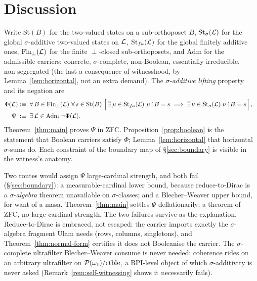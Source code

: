 \section{Discussion}\label{sec:discussion}

Write
$\mathrm{St}(B)$ for the two-valued states on a sub-orthoposet $B$,
$\mathrm{St}_\sigma(\mathcal{L})$ for the global $\sigma$-additive two-valued states on
$\mathcal{L}$, $\mathrm{St}_{fa}(\mathcal{L})$ for the global finitely additive ones,
$\mathrm{Fin}_\perp(\mathcal{L})$ for the finite $\perp$-closed sub-orthoposets, and
$\mathrm{Adm}$ for the admissible carriers: concrete, $\sigma$-complete,
non-Boolean, essentially irreducible, non-segregated (the last a consequence
of witnesshood, by Lemma~\ref{lem:horizontal}, not an extra demand). The \emph{$\sigma$-additive lifting}
property and its negation are
\begin{align*}
  \Phi(\mathcal{L})
    &:\equiv\;
    \forall\, B \in \mathrm{Fin}_\perp(\mathcal{L})\
    \forall\, s \in \mathrm{St}(B)\ \Bigl[\,
    \exists\,\mu\in\mathrm{St}_{fa}(\mathcal{L})\ \mu\!\restriction\! B=s
    \;\Longrightarrow\;
    \exists\, \nu \in \mathrm{St}_\sigma(\mathcal{L})\ \nu \!\restriction\! B = s \,\Bigr],\\
  \Psi \;&:\equiv\; \exists\, \mathcal{L} \in \mathrm{Adm}\ \neg\Phi(\mathcal{L}).
\end{align*}
Theorem~\ref{thm:main} proves $\Psi$ in ZFC. Proposition~\ref{prop:boolean} is
the statement that Boolean carriers satisfy $\Phi$; Lemma~\ref{lem:horizontal}
that horizontal $\sigma$-sums do. Each constraint of the boundary map of
\S\ref{sec:boundary} is visible in the witness's anatomy.

\begin{remark}\label{rem:strength}
Two routes would assign $\Psi$ large-cardinal strength, and both fail
(\S\ref{sec:boundary}): a measurable-cardinal lower bound, because reduce-to-Dirac
is a $\sigma$-\emph{algebra} theorem unavailable on $\sigma$-classes; and a
Blecher--Weaver upper bound, for want of a masa. Theorem~\ref{thm:main} settles
$\Psi$ deflationarily: a theorem of ZFC, no large-cardinal strength. The two
failures survive as the explanation. Reduce-to-Dirac is embraced, not escaped:
the carrier imports exactly the $\sigma$-algebra fragment Ulam needs (rows,
columns, singletons), and Theorem~\ref{thm:normal-form} certifies it does not
Booleanise the carrier. The $\sigma$-complete ultrafilter Blecher--Weaver consume
is never needed: coherence rides on an arbitrary ultrafilter on
$\mathcal{P}(\omega_1)/\mathrm{ctble}$, a BPI-level object of which $\sigma$-additivity
is never asked (Remark~\ref{rem:self-witnessing} shows it necessarily fails).
\end{remark}


